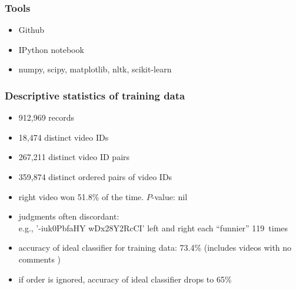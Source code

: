 \documentclass[fleqn]{beamer}
\begin{document}
\begin{frame}
\frametitle{Tools}
   \begin{itemize}
        \item Github
        \item IPython notebook
        \item numpy, scipy, matplotlib, nltk, scikit-learn
   \end{itemize}

\end{frame}

 \begin{frame}
\frametitle{Descriptive statistics of training data}
      \begin{itemize}
         \item 912,969 records
         \item 18,474 distinct video IDs
         \item 267,211 distinct video ID pairs
         \item 359,874 distinct ordered pairs of video IDs
         \item right video won 51.8\% of the time. $P$-value: nil
         \item judgments often discordant: \\
                  e.g., '-iuk0PbfaHY wDx28Y2RcCI' left and right each ``funnier'' 119~times
         \item accuracy of ideal classifier for training data: 73.4\% (includes videos with no comments )
         \item if order is ignored,  accuracy of ideal classifier drops to 65\%
     \end{itemize}

\end{frame}
\end{document}
